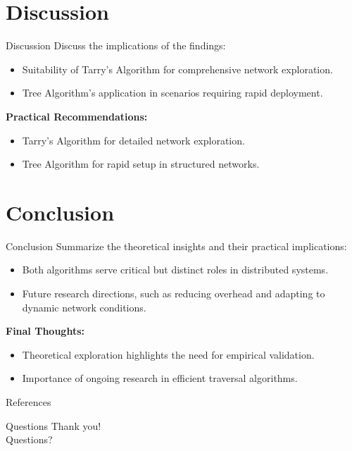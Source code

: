 \documentclass[11pt]{beamer}  %
\begin{document}
\section{Discussion}
\begin{frame}{Discussion}
    Discuss the implications of the findings:
    \begin{itemize}
        \item Suitability of Tarry’s Algorithm for comprehensive network exploration.
        \item Tree Algorithm's application in scenarios requiring rapid deployment.
    \end{itemize}
    \textbf{Practical Recommendations:}
    \begin{itemize}
        \item Tarry's Algorithm for detailed network exploration.
        \item Tree Algorithm for rapid setup in structured networks.
    \end{itemize}
\end{frame}

\section{Conclusion}
\begin{frame}{Conclusion}
    Summarize the theoretical insights and their practical implications:
    \begin{itemize}
        \item Both algorithms serve critical but distinct roles in distributed systems.
        \item Future research directions, such as reducing overhead and adapting to dynamic network conditions.
    \end{itemize}
    \textbf{Final Thoughts:}
    \begin{itemize}
        \item Theoretical exploration highlights the need for empirical validation.
        \item Importance of ongoing research in efficient traversal algorithms.
    \end{itemize}
\end{frame}

\begin{frame}{References}
\end{frame}

\begin{frame}{Questions}
    \centering \Large
    Thank you!\\
    Questions?
\end{frame}
\end{document}
